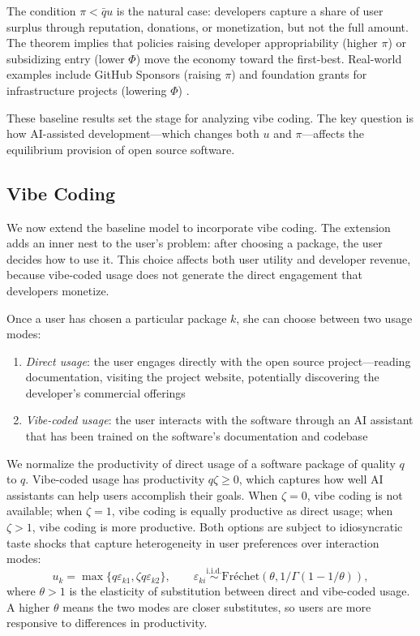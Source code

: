 \documentclass[11pt,a4paper]{article}
\theoremstyle{definition}
\theoremstyle{remark}
\begin{document}
The condition \(\pi < \bar{q}u\) is the natural case: developers capture
a share of user surplus through reputation, donations, or monetization,
but not the full amount. The theorem implies that policies raising
developer appropriability (higher \(\pi\)) or subsidizing entry (lower
\(\Phi\)) move the economy toward the first-best. Real-world examples include GitHub Sponsors (raising \(\pi\)) and foundation grants for infrastructure projects (lowering \(\Phi\)) \citep{boysel-nagle-carter-hermansen-crosby-luszcz-lincoln-yue-hoffmann-staub-2024-oss-funding}.

These baseline results set the stage for analyzing vibe coding. The key
question is how AI-assisted development---which changes both \(u\) and
\(\pi\)---affects the equilibrium provision of open source software.

\subsection{Vibe Coding}\label{vibe-coding}

We now extend the baseline model to incorporate vibe coding. The
extension adds an inner nest to the user's problem: after choosing a
package, the user decides how to use it. This choice affects both user
utility and developer revenue, because vibe-coded usage does not
generate the direct engagement that developers monetize.

Once a user has chosen a particular package \(k\), she can choose
between two usage modes:

\begin{enumerate}
\item \emph{Direct usage}: the user engages directly with the open source project---reading documentation, visiting the project website, potentially discovering the developer's commercial offerings
\item \emph{Vibe-coded usage}: the user interacts with the software through an AI assistant that has been trained on the software's documentation and codebase
\end{enumerate}

We normalize the productivity of direct usage of a software package of quality $q$ to $q$. Vibe-coded usage has
productivity \(q \zeta \geq 0\), which captures how well AI assistants can
help users accomplish their goals. When \(\zeta = 0\), vibe coding is
not available; when \(\zeta = 1\), vibe coding is equally productive as
direct usage; when \(\zeta > 1\), vibe coding is more productive. Both
options are subject to idiosyncratic taste shocks that capture
heterogeneity in user preferences over interaction modes:
\begin{equation}
u_k = \max\{q \varepsilon_{k1}, \zeta q \varepsilon_{k2}\}, \qquad \varepsilon_{ki} \stackrel{\text{i.i.d.}}{\sim} \text{Fr\'{e}chet}\left(\theta, 1/\Gamma(1-1/\theta)\right), \label{eq:inner-frechet}
\end{equation} where \(\theta > 1\) is the elasticity of substitution
between direct and vibe-coded usage. A higher \(\theta\) means the two
modes are closer substitutes, so users are more responsive to
differences in productivity.
\end{document}
